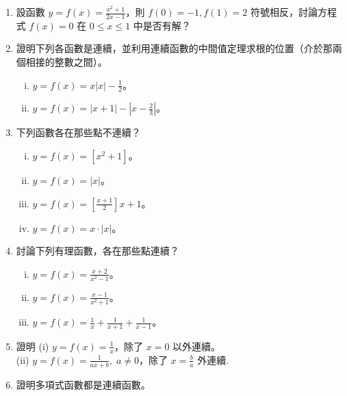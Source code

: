 \begin{enumerate}
    \item 設函數 $y = f(x) = \frac{x^2+1}{2x-1}$，則 $f(0) = -1, f(1) = 2$ 符號相反，討論方程式 $f(x)=0$ 在 $0 \le x \le 1$ 中是否有解？
    \item 證明下列各函數是連續，並利用連續函數的中間值定理求根的位置（介於那兩個相接的整數之間）。
    \begin{enumerate}[(i)]
        \item $y = f(x) = x|x| - \frac{1}{2}$。
        \item $y = f(x) = |x+1| - |x - \frac{2}{3}|$。
    \end{enumerate}
    \item 下列函數各在那些點不連續？
    \begin{enumerate}[(i)]
        \item $y = f(x) = [x^2+1]$。
        \item $y = f(x) = |x|$。
        \item $y = f(x) = [\frac{x+1}{2}]x + 1$。
        \item $y = f(x) = x\cdot |x|$。
    \end{enumerate}
    \item 討論下列有理函數，各在那些點連續？
    \begin{enumerate}[(i)]
        \item $y = f(x) = \frac{x+2}{x^2-1}$。
        \item $y = f(x) = \frac{x-1}{x^2+1}$。
        \item $y = f(x) = \frac{1}{x} + \frac{1}{x+1} + \frac{1}{x-1}$。
    \end{enumerate}
    \item 證明 (i) $y = f(x) = \frac{1}{x}$，除了 $x = 0$ 以外連續。\\
    (ii) $y = f(x) = \frac{1}{ax+b},\; a\neq 0$，除了 $x = \frac{b}{a}$ 外連續\label{note:b2-ch3-ex3-5-q5-sign}.
    \item 證明多項式函數都是連續函數。
\end{enumerate}
